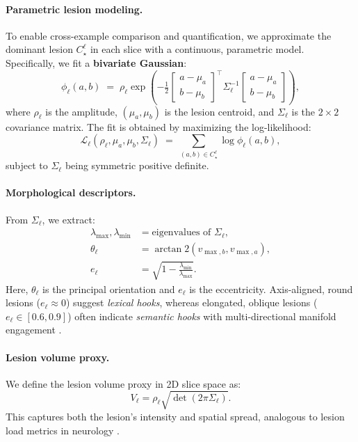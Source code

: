 \documentclass[11pt]{article}
\begin{document}
\paragraph{Parametric lesion modeling.}
To enable cross-example comparison and quantification, we approximate the dominant lesion $C_\star^\ell$ in each slice with a continuous, parametric model.  
Specifically, we fit a \textbf{bivariate Gaussian}:
\[
\phi_\ell(a,b) \;=\; \rho_\ell \exp\!\left(-\tfrac{1}{2}
\begin{bmatrix} a - \mu_a \\ b - \mu_b \end{bmatrix}^\top
\Sigma_\ell^{-1}
\begin{bmatrix} a - \mu_a \\ b - \mu_b \end{bmatrix}
\right),
\]
where $\rho_\ell$ is the amplitude, $(\mu_a,\mu_b)$ is the lesion centroid, and $\Sigma_\ell$ is the $2\times 2$ covariance matrix.  
The fit is obtained by maximizing the log-likelihood:
\[
\mathcal{L}_\ell(\rho_\ell, \mu_a, \mu_b, \Sigma_\ell) 
\;=\; \sum_{(a,b) \in C_\star^\ell} \log \phi_\ell(a,b),
\]
subject to $\Sigma_\ell$ being symmetric positive definite.

\paragraph{Morphological descriptors.}
From $\Sigma_\ell$, we extract:
\begin{align*}
\lambda_{\max},\lambda_{\min} &= \text{eigenvalues of }\Sigma_\ell, \\
\theta_\ell &= \arctan2(v_{\max,b}, v_{\max,a}), \\
e_\ell &= \sqrt{1 - \frac{\lambda_{\min}}{\lambda_{\max}}}.
\end{align*}
Here, $\theta_\ell$ is the principal orientation and $e_\ell$ is the eccentricity.  
Axis-aligned, round lesions ($e_\ell \approx 0$) suggest \textit{lexical hooks}, whereas elongated, oblique lesions ($e_\ell \in [0.6,0.9]$) often indicate \textit{semantic hooks} with multi-directional manifold engagement \citep{dalvi2022discovering}.

\paragraph{Lesion volume proxy.}
We define the lesion volume proxy in 2D slice space as:
\[
V_\ell = \rho_\ell \sqrt{\det(2\pi \Sigma_\ell)}.
\]
This captures both the lesion’s intensity and spatial spread, analogous to lesion load metrics in neurology \citep{schmidt2019lesionload}.
\end{document}
